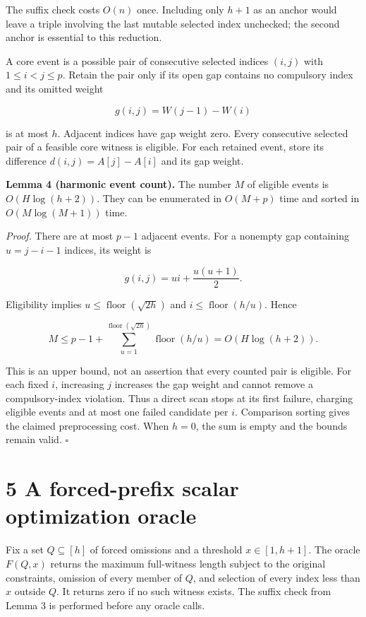 \documentclass[
  11pt,
  letterpaper,
]{article}
\begin{document}
The suffix check costs \(O(n)\) once. Including only \(h+1\) as an
anchor would leave a triple involving the last mutable selected index
unchecked; the second anchor is essential to this reduction.

A core event is a possible pair of consecutive selected indices
\((i,j)\) with \(1\leq i<j\leq p\). Retain the pair only if its open gap
contains no compulsory index and its omitted weight

\[g(i,j)=W(j-1)-W(i)\]

is at most \(h\). Adjacent indices have gap weight zero. Every
consecutive selected pair of a feasible core witness is eligible. For
each retained event, store its difference \(d(i,j)=A[j]-A[i]\) and its
gap weight.

\textbf{Lemma 4 (harmonic event count).} The number \(M\) of eligible
events is \(O(H\log(h+2))\). They can be enumerated in \(O(M+p)\) time
and sorted in \(O(M\log(M+1))\) time.

\emph{Proof.} There are at most \(p-1\) adjacent events. For a nonempty
gap containing \(u=j-i-1\) indices, its weight is

\[g(i,j)=ui+\frac{u(u+1)}2.\]

Eligibility implies \(u\leq\operatorname{floor}(\sqrt{2h})\) and
\(i\leq\operatorname{floor}(h/u)\). Hence

\[M\leq p-1+\sum_{u=1}^{\operatorname{floor}(\sqrt{2h})}\operatorname{floor}(h/u)
=O(H\log(h+2)).\]

This is an upper bound, not an assertion that every counted pair is
eligible. For each fixed \(i\), increasing \(j\) increases the gap
weight and cannot remove a compulsory-index violation. Thus a direct
scan stops at its first failure, charging eligible events and at most
one failed candidate per \(i\). Comparison sorting gives the claimed
preprocessing cost. When \(h=0\), the sum is empty and the bounds remain
valid. \(\square\)

\hypertarget{a-forced-prefix-scalar-optimization-oracle}{%
\section{5 A forced-prefix scalar optimization
oracle}\label{a-forced-prefix-scalar-optimization-oracle}}

Fix a set \(Q\subseteq[h]\) of forced omissions and a threshold
\(x\in[1,h+1]\). The oracle \(F(Q,x)\) returns the maximum full-witness
length subject to the original constraints, omission of every member of
\(Q\), and selection of every index less than \(x\) outside \(Q\). It
returns zero if no such witness exists. The suffix check from Lemma 3 is
performed before any oracle calls.
\end{document}

